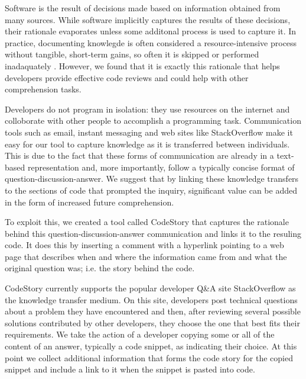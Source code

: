 \documentclass[../manifest.tex]{subfiles}
\begin{document}
Software is the result of decisions made based on information obtained from many sources. While software implicitly captures the results of these decisions, their rationale evaporates unless some additonal process is used to capture it. In practice, documenting knowlegde is often considered a resource-intensive process without tangible, short-term gains, so often it is skipped or performed inadaquately \cite{OZ2008,NH2007}. However, we found that it is exactly this rationale that helps developers provide effective code reviews and could help with other comprehension tasks.

Developers do not program in isolation: they use resources on the internet and colloborate with other people to accomplish a programming task. Communication tools such as email, instant messaging and web sites like StackOverflow make it easy for our tool to capture knowledge as it is transferred between individuals. This is due to the fact that these forms of communication are already in a text-based representation and, more importantly, follow a typically concise format of question-discussion-answer. We suggest that by linking these knowledge transfers to the sections of code that prompted the inquiry, significant value can be added in the form of increased future comprehension.

To exploit this, we created a tool called CodeStory that captures the rationale behind this question-discussion-answer communication and links it to the resuling code. It does this by inserting a comment with a hyperlink pointing to a web page that describes when and where the information came from and what the original question was; i.e. the story behind the code.

CodeStory currently supports the popular developer Q\&A site StackOverflow as the knowledge transfer medium. On this site, developers post technical questions about a problem they have encountered and then, after reviewing several possible solutions contributed by other developers, they choose the one that best fits their requirements. We take the action of a developer copying some or all of the content of an answer, typically a code snippet, as indicating their choice. At this point we collect additional information that forms the code story for the copied snippet and include a link to it when the snippet is pasted into code.
\end{document}

